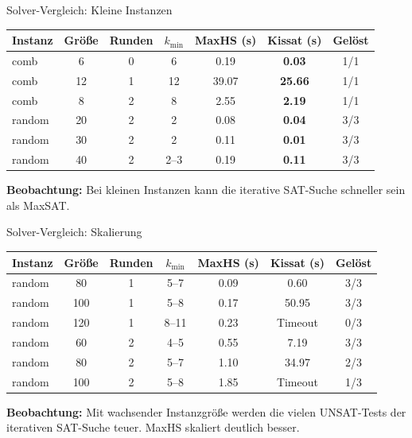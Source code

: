 \documentclass[11pt,aspectratio=169]{beamer}
\begin{document}
\begin{frame}{Solver-Vergleich: Kleine Instanzen}
\centering\small

\begin{tabular}{lcccccc}
\toprule
Instanz & Größe & Runden & $k_{\min}$ &
MaxHS (s) & Kissat (s) & Gelöst \\
\midrule
comb   & 6  & 0 & 6  & 0.19 & \textbf{0.03} & 1/1 \\
comb   & 12 & 1 & 12 & 39.07 & \textbf{25.66} & 1/1 \\
comb   & 8  & 2 & 8  & 2.55 & \textbf{2.19} & 1/1 \\
\midrule
random & 20 & 2 & 2 & 0.08 & \textbf{0.04} & 3/3 \\
random & 30 & 2 & 2 & 0.11 & \textbf{0.01} & 3/3 \\
random & 40 & 2 & 2--3 & 0.19 & \textbf{0.11} & 3/3 \\
\bottomrule
\end{tabular}

\vspace{0.5em}

\textbf{Beobachtung:}
Bei kleinen Instanzen kann die iterative SAT-Suche schneller sein als MaxSAT.
\end{frame}



\begin{frame}{Solver-Vergleich: Skalierung}
\centering\small

\begin{tabular}{lcccccc}
\toprule
Instanz & Größe & Runden & $k_{\min}$ &
MaxHS (s) & Kissat (s) & Gelöst \\
\midrule
random & 80  & 1 & 5--7  & 0.09 & 0.60 & 3/3 \\
random & 100 & 1 & 5--8  & 0.17 & 50.95 & 3/3 \\
random & 120 & 1 & 8--11 & 0.23 & \textcolor{myred}{Timeout} & 0/3 \\
\midrule
random & 60  & 2 & 4--5 & 0.55 & 7.19 & 3/3 \\
random & 80  & 2 & 5--7 & 1.10 & 34.97 & 2/3 \\
random & 100 & 2 & 5--8 & 1.85 & \textcolor{myred}{Timeout} & 1/3 \\
\bottomrule
\end{tabular}

\vspace{0.5em}

\textbf{Beobachtung:}
Mit wachsender Instanzgröße werden die vielen UNSAT-Tests der iterativen
SAT-Suche teuer. MaxHS skaliert deutlich besser.
\end{frame}
\end{document}
